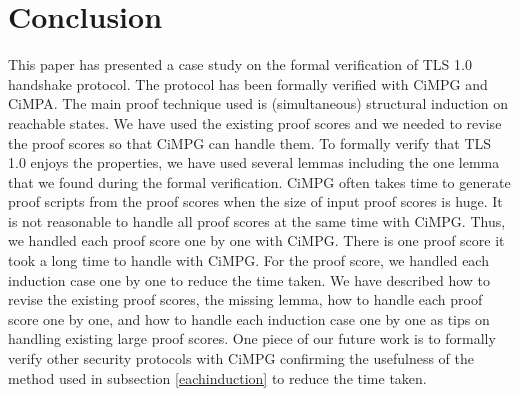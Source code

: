 \documentclass[a4paper,fleqn]{cas-dc}
\begin{document}
\section{Conclusion}\label{conclusion}
This paper has presented a case study on the formal verification of TLS 1.0 handshake protocol. The protocol has been formally verified with CiMPG and CiMPA. The main proof technique used is (simultaneous) structural induction on reachable states. We have used the existing proof scores and we needed to revise the proof scores so that CiMPG can handle them. To formally verify that TLS 1.0 enjoys the properties, we have used several lemmas including the one lemma that we found during the formal verification. CiMPG often takes time to generate proof scripts from the proof scores when the size of input proof scores is huge. It is not reasonable to handle all proof scores at the same time with CiMPG. Thus, we handled each proof score one by one with CiMPG. There is one proof score it took a long time to handle with CiMPG. For the proof score, we handled each induction case one by one to reduce the time taken. We have described how to revise the existing proof scores, the missing lemma, how to handle each proof score one by one, and how to handle each induction case one by one as tips on handling existing large proof scores. One piece of our future work is to formally verify other security protocols with CiMPG confirming the usefulness of the method used in subsection \ref{eachinduction} to reduce the time taken. 
      





\end{document}
